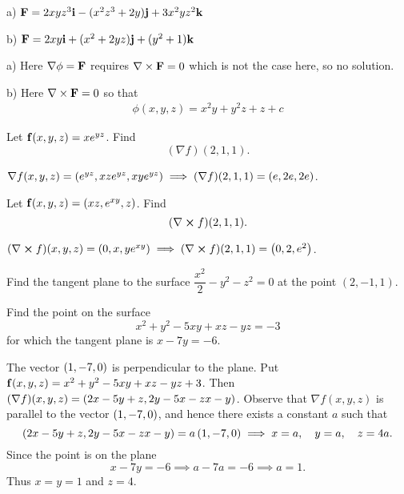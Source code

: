 \begin{multicols}{2}
\begin{problem}
a) $\mathbf{  F} = 
2 x y z^{3} \mathbf{  i} -
(x^{2} z^{3} + 2 y) \mathbf{  j} +
3 x^{2} y z^{2} \mathbf{  k}$

b) $\mathbf{  F} = 
2 x y \mathbf{  i} +
(x^{2} + 2 y z) \mathbf{  j} +
(y^{2} + 1) \mathbf{  k}$

\begin{answer}
 
a) Here $\nabla \phi = \mathbf{  F}$ requires $\nabla \times \mathbf{  F} = 0$ which is 
not the case here, so no solution.


b) Here $\nabla \times \mathbf{  F} = 0$ so that
\begin{eqnarray*}
\phi(x,y,z) = x^{2} y + y^{2} z + z + c
\end{eqnarray*}

\end{answer}

\end{problem}


\begin{problem}
Let $\mathbf{ f}(x,y,z)=xe^{yz}$. Find $$(\nabla f)(2,1,1).$$
\begin{answer}
$\nabla f(x,y,z)=\left( e^{yz} ,xze^{yz},xye^{yz} \right)\implies
(\nabla f)(2,1,1) =  \left( e,2e,2e \right) $.
\end{answer}
\end{problem}

\begin{problem}
Let $\mathbf{ f}(x,y,z)=\left( xz,e^{xy} ,z \right)$. Find $$(\nabla \boldsymbol\times
f)(2,1,1).$$

\begin{answer}
$(\nabla \boldsymbol\times f)(x,y,z)=\left( 0,x, ye^{xy} \right) \implies (\nabla
\boldsymbol\times f)(2,1,1)=\left( 0,2 ,e^2 \right)$.
\end{answer}
\end{problem}


\begin{problem}
Find the tangent plane to the surface  $\dfrac{x^2}{2}-y^2-z^2=0$ at
the point  $(2,-1,1)$.
\end{problem}
\begin{problem}
Find the point on the surface $$x^2+y^2-5xy+xz-yz=-3$$ for which the
tangent plane is $x-7y=-6$.
\begin{answer}
 The vector $\left( 1 ,-7 ,0 \right)$ is perpendicular to the plane. Put $\mathbf{ f}(x,y,z)=x^2+y^2-5xy+xz-yz+3$. Then $(\nabla f)(x,y,z)=\left( 2x-5y+z ,2y-5x-z \\
x-y \right)$. Observe that $\nabla f(x,y,z)$ is parallel to the vector
$\left( 1 ,-7 ,0 \right)$, and hence there exists a constant $a$ such
that $$ \left( 2x-5y+z ,2y-5x-z \\
x-y \right)=a\left( 1 ,-7 ,0 \right) \implies x=a, \quad y=a, \quad z=4a.$$
Since the point is on the plane $$x-7y=-6 \implies a-7a=-6 \implies
a=1.$$ Thus $x=y=1$ and $z=4$.
\end{answer}
\end{problem}


\end{multicols}
